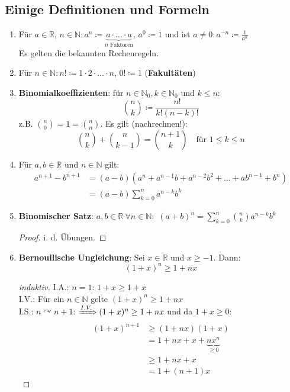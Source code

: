\documentclass[titlepage,ngerman,a4paper,headsepline,DIV15,halfparskip*,14pt]{scrartcl}
\newcommand{\R}{\mathbb{R}}
\newcommand{\N}{\mathbb{N}}
\theoremstyle{dotless}
\begin{document}
\subsection*{Einige Definitionen und Formeln} 
\begin{enumerate}
	\item Für $a \in \R$, $n \in \N: a^{n} \coloneqq \underbrace{a \cdot \dotsc \cdot a}_{n \text{ Faktoren}}$, $a^{0} \coloneqq 1$ und ist $a \neq 0: a^{-n} \coloneqq \frac{1}{a^{n}}$ \\
		Es gelten die bekannten Rechenregeln.
	\item Für $n \in \N: n! \coloneqq 1 \cdot 2 \cdot \dotsc \cdot n$, $0! \coloneqq 1$ (\textbf{Fakultäten})
	\item \textbf{Binomialkoeffizienten}: für $n \in \N_{0}, k \in \N_{0}$ und $k \leq n$:
		$$
			\binom{n}{k} \coloneqq \frac{n!}{k!(n - k)!}
		$$
		z.B. $\binom{n}{0} = 1 = \binom{n}{n}$. Es gilt (nachrechnen!): \\
		$$
			\binom{n}{k} + \binom{n}{k - 1} = \binom{n + 1}{k} \quad \text{für } 1 \leq k \leq n
		$$
	\item Für $a, b \in \R$ und $n \in \N$ gilt: 
		\begin{align*}
			a^{n + 1} - b^{n + 1} & = (a - b) \left(a^{n} + a^{n-1}b + a^{n-2}b^{2} + \dotsc + a b^{n-1} + b^{n} \right) \\
				& = (a - b) \sum_{k = 0}^{n} a^{n -k}b^{k}
		\end{align*}
	\item \textbf{Binomischer Satz}: $a, b \in \R ~\forall n \in \N:$ $(a + b)^{n} = \sum_{k = 0}^{n} \binom{n}{k} a^{n-k}b^{k}$
		\begin{proof}
			i. d. Übungen.
		\end{proof}
	\item \textbf{Bernoullische Ungleichung}: Sei $x \in \R$ und $x \geq -1$. Dann:
		$$ (1 + x)^{n} \geq 1 + n x$$
		\begin{proof}[induktiv]
			I.A.: $n = 1$: $1 + x \geq 1 + x$ \\
			I.V.: Für ein $n \in \N$ gelte $(1 + x)^{n} \geq 1 + nx$ \\
			I.S.: $n \curvearrowright n + 1$: $\xRightarrow[]{I.V.} (1 + x)^{n} \geq 1 + n x$ und da $1 + x \geq 0$:
			\begin{align*}
				(1 + x)^{n + 1} & \geq (1 + nx)(1 + x) \\
								& = 1 + nx + x + \underbrace{nx^{n}}_{\geq 0} \\
								& \geq 1 + nx + x \\
								& = 1 + (n + 1)x
			\end{align*}
		\end{proof}
\end{enumerate}
\end{document}
